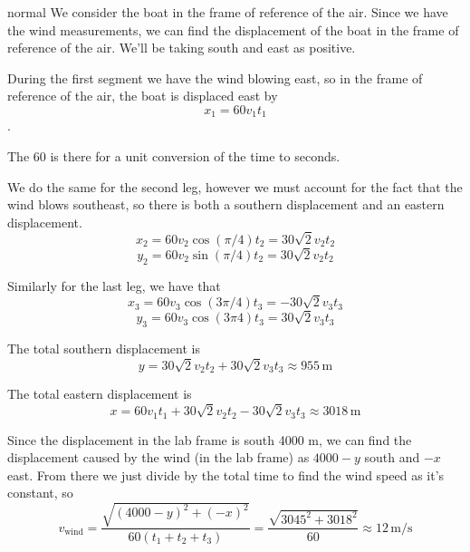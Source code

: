 \begin{solution}{normal}
We consider the boat in the frame of reference of the air. Since we have the wind measurements, we can find the displacement of the boat in the frame of reference of the air. We'll be taking south and east as positive. \vspace{3mm}

During the first segment we have the wind blowing east, so in the frame of reference of the air, the boat is displaced east by $$x_1 = 60v_1t_1$$. \vspace{3mm}

The 60 is there for a unit conversion of the time to seconds. \vspace{3mm}

We do the same for the second leg, however we must account for the fact that the wind blows southeast, so there is both a southern displacement and an eastern displacement.
$$x_2 = 60v_2\cos(\pi/4)t_2 = 30\sqrt{2}v_2t_2$$
$$y_2 = 60v_2\sin(\pi/4)t_2=30\sqrt{2}v_2t_2$$

Similarly for the last leg, we have that
$$x_3 = 60v_3 \cos(3\pi/4)t_3 = -30\sqrt{2}v_3t_3$$
$$y_3 = 60v_3\cos(3\pi4)t_3 = 30\sqrt{2}v_3t_3$$

The total southern displacement is
$$y = 30\sqrt{2}v_2t_2+30\sqrt{2}v_3t_3 \approx 955 \, \mathrm{m}$$

The total eastern displacement is 
$$x = 60v_1t_1+30\sqrt{2}v_2t_2-30\sqrt{2}v_3t_3 \approx 3018 \, \mathrm{m}$$

Since the displacement in the lab frame is south 4000 m, we can find the displacement caused by the wind (in the lab frame) as $4000-y$ south and $-x$ east. From there we just divide by the total time to find the wind speed as it's constant, so
$$v_\text{wind} = \dfrac{\sqrt{(4000-y)^2 + (-x)^2}}{60(t_1 + t_2 +t_3)} = \dfrac{\sqrt{3045^2 + 3018^2}}{60} \approx \boxed{12 \, \mathrm{m/s}}$$
\end{solution}